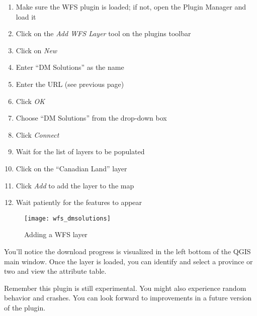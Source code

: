 \begin{enumerate}
  \item Make sure the WFS plugin is loaded; if not, open the Plugin Manager and load it
  \item Click on the \textsl{Add WFS Layer} tool on the plugins toolbar
  \item Click on \textsl{New} 
  \item Enter ``DM Solutions'' as the name
  \item Enter the URL (see previous page)
  \item Click \textsl{OK} 
  \item Choose ``DM Solutions'' from the drop-down box
  \item Click \textsl{Connect} 
  \item Wait for the list of layers to be populated
  \item Click on the ``Canadian Land'' layer
  \item Click \textsl{Add} to add the layer to the map
  \item Wait patiently for the features to appear
\end{enumerate}

\begin{figure}[ht]
 \begin{center}
  \caption{Adding a WFS layer}\label{fig:wfs_dmsolutions}
  \texttt{[image: wfs\_dmsolutions]}
 \end{center}
\end{figure}

You'll notice the download progress is visualized in the left bottom of the QGIS main window. 
Once the layer is loaded, you can identify and select a province or two and view the 
attribute table.

Remember this plugin is still experimental. You might also experience random behavior 
and crashes. You can look forward to improvements in a future version of the plugin.

\begin{Tip}[h]\caption{\textsc{Finding WMS and WFS Servers}}
\end{Tip} 
